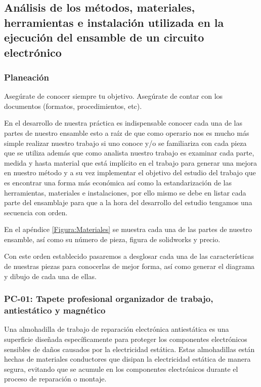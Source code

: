     \subsection{Análisis de los métodos, materiales, herramientas e instalación utilizada en la ejecución del ensamble de un circuito electrónico}
    
    \subsubsection{Planeación}
    
    Asegúrate de conocer siempre tu objetivo.
    Asegúrate de contar con los documentos (formatos, procedimientos, etc).
    
    En el desarrollo de nuestra práctica es indispensable conocer cada una de las partes de nuestro ensamble esto a raíz de que como operario nos es mucho más simple realizar nuestro trabajo si uno conoce y/o se familiariza con cada pieza que se utiliza además que como analista nuestro trabajo es examinar cada parte, medida y hasta material que está implícito en el trabajo para generar una mejora en nuestro método y a su vez implementar el objetivo del estudio del trabajo que es encontrar una forma más económica así como la estandarización de las herramientas, materiales e instalaciones, por ello mismo se debe en listar cada parte del ensamblaje para que a la hora del desarrollo del estudio tengamos una secuencia con orden.
    
    En el apéndice \ref{Figura:Materiales} se muestra cada una de las partes de nuestro ensamble, así como su número de pieza, figura de solidworks y precio.
    
    Con este orden establecido pasaremos a desglosar cada una de las características de nuestras piezas para conocerlas de mejor forma, así como generar  el diagrama y dibujo de cada una de ellas.
    
    \subsubsection{PC-01: Tapete profesional organizador de trabajo, antiestático y magnético}
    
    Una almohadilla de trabajo de reparación electrónica antiestática es una superficie diseñada específicamente para proteger los componentes electrónicos sensibles de daños causados por la electricidad estática. Estas almohadillas están hechas de materiales conductores que disipan la electricidad estática de manera segura, evitando que se acumule en los componentes electrónicos durante el proceso de reparación o montaje.
    
